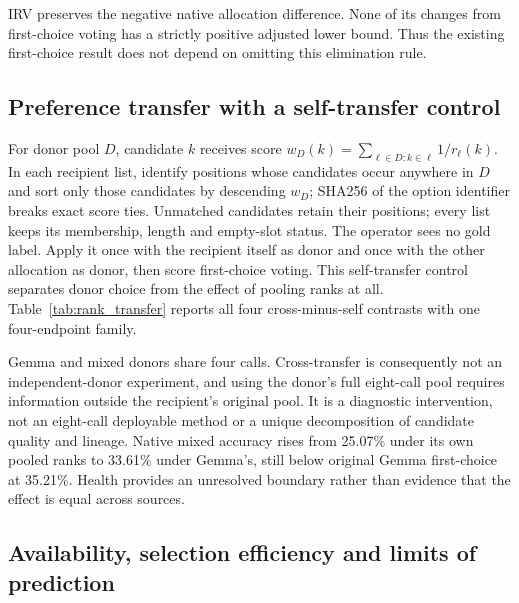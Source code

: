 IRV preserves the negative native allocation difference. None of its changes from first-choice voting has a strictly positive adjusted lower bound. Thus the existing first-choice result does not depend on omitting this elimination rule.

\subsection{Preference transfer with a self-transfer control}\label{app:rank_transfer}

For donor pool $D$, candidate $k$ receives score $w_D(k)=\sum_{\ell\in D:k\in\ell}1/r_\ell(k)$. In each recipient list, identify positions whose candidates occur anywhere in $D$ and sort only those candidates by descending $w_D$; SHA256 of the option identifier breaks exact score ties. Unmatched candidates retain their positions; every list keeps its membership, length and empty-slot status. The operator sees no gold label. Apply it once with the recipient itself as donor and once with the other allocation as donor, then score first-choice voting. This self-transfer control separates donor choice from the effect of pooling ranks at all. Table~\ref{tab:rank_transfer} reports all four cross-minus-self contrasts with one four-endpoint family.

Gemma and mixed donors share four calls. Cross-transfer is consequently not an independent-donor experiment, and using the donor's full eight-call pool requires information outside the recipient's original pool. It is a diagnostic intervention, not an eight-call deployable method or a unique decomposition of candidate quality and lineage. Native mixed accuracy rises from 25.07\% under its own pooled ranks to 33.61\% under Gemma's, still below original Gemma first-choice at 35.21\%. Health provides an unresolved boundary rather than evidence that the effect is equal across sources.

\subsection{Availability, selection efficiency and limits of prediction}\label{app:selection_bound}

